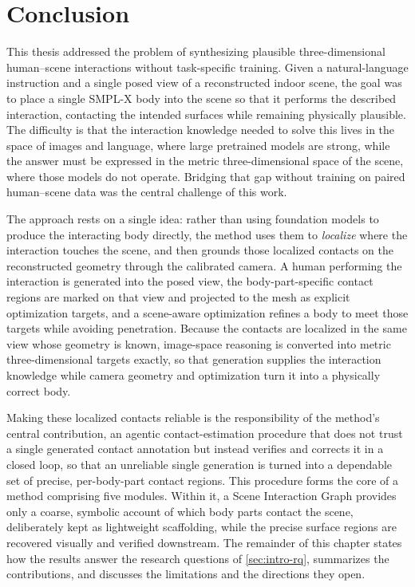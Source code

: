 \chapter{Conclusion}
\label{chap:conclusion}

This thesis addressed the problem of synthesizing plausible three-dimensional human--scene interactions without task-specific training. Given a natural-language instruction and a single posed view of a reconstructed indoor scene, the goal was to place a single SMPL-X body into the scene so that it performs the described interaction, contacting the intended surfaces while remaining physically plausible. The difficulty is that the interaction knowledge needed to solve this lives in the space of images and language, where large pretrained models are strong, while the answer must be expressed in the metric three-dimensional space of the scene, where those models do not operate. Bridging that gap without training on paired human--scene data was the central challenge of this work.

The approach rests on a single idea: rather than using foundation models to produce the interacting body directly, the method uses them to \emph{localize} where the interaction touches the scene, and then grounds those localized contacts on the reconstructed geometry through the calibrated camera. A human performing the interaction is generated into the posed view, the body-part-specific contact regions are marked on that view and projected to the mesh as explicit optimization targets, and a scene-aware optimization refines a body to meet those targets while avoiding penetration. Because the contacts are localized in the same view whose geometry is known, image-space reasoning is converted into metric three-dimensional targets exactly, so that generation supplies the interaction knowledge while camera geometry and optimization turn it into a physically correct body.

Making these localized contacts reliable is the responsibility of the method's central contribution, an agentic contact-estimation procedure that does not trust a single generated contact annotation but instead verifies and corrects it in a closed loop, so that an unreliable single generation is turned into a dependable set of precise, per-body-part contact regions. This procedure forms the core of a method comprising five modules. Within it, a Scene Interaction Graph provides only a coarse, symbolic account of which body parts contact the scene, deliberately kept as lightweight scaffolding, while the precise surface regions are recovered visually and verified downstream. The remainder of this chapter states how the results answer the research questions of \cref{sec:intro-rq}, summarizes the contributions, and discusses the limitations and the directions they open.

